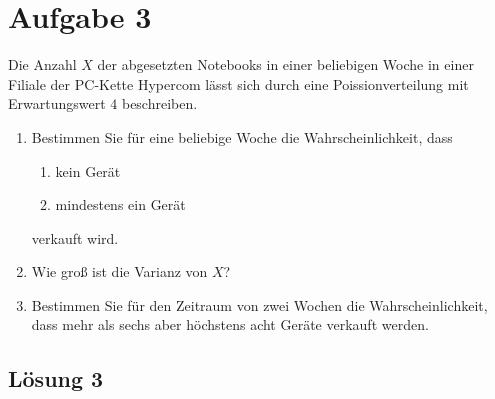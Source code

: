 \documentclass[main.tex]{subfiles}
\begin{document}
\section{Aufgabe 3}
Die Anzahl $X$ der abgesetzten Notebooks in einer beliebigen Woche in einer Filiale der PC-Kette Hypercom lässt sich durch eine Poissionverteilung mit Erwartungswert $4$ beschreiben.
\begin{enumerate}
\item Bestimmen Sie für eine beliebige Woche die Wahrscheinlichkeit, dass
\begin{enumerate}
\item kein Gerät
\item mindestens ein Gerät
\end{enumerate}
verkauft wird.
\item Wie groß ist die Varianz von $X$?
\item Bestimmen Sie für den Zeitraum von zwei Wochen die Wahrscheinlichkeit, dass mehr als sechs aber höchstens acht Geräte verkauft werden.
\end{enumerate}

\subsection{Lösung 3}
\end{document}
